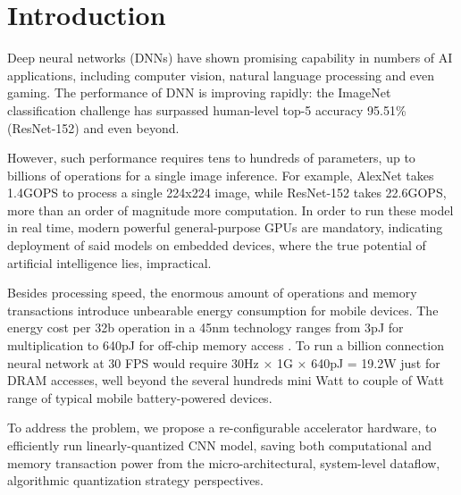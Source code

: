 \chapter{Introduction}
\label{ch:intro}

Deep neural networks (DNNs) have shown promising capability in numbers of AI applications, including computer vision, natural language processing and even gaming. The performance of DNN is improving rapidly: the ImageNet classification challenge has surpassed human-level top-5 accuracy 95.51\% (ResNet-152)\cite{ResNet} and even beyond.

However, such performance requires tens to hundreds of parameters, up to billions of operations for a single image inference. For example, AlexNet \cite{AlexNet} takes 1.4GOPS to process a single 224x224 image, while ResNet-152 takes
22.6GOPS, more than an order of magnitude more computation. In order to run these model in real time, modern powerful general-purpose GPUs are mandatory, indicating deployment of said models on embedded devices, where the true potential of artificial intelligence lies, impractical. 

Besides processing speed, the enormous amount of operations and memory transactions introduce unbearable energy consumption for mobile devices. The energy cost per 32b operation in a 45nm
technology ranges from 3pJ for multiplication to 640pJ for off-chip memory access \cite{EIE}. To run a billion
connection neural network at 30 FPS would require 30Hz × 1G × 640pJ = 19.2W just
for DRAM accesses, well beyond the several hundreds mini Watt to couple of Watt range of typical mobile battery-powered devices.

To address the problem, we propose a re-configurable accelerator hardware, to efficiently run linearly-quantized CNN model, saving both computational and memory transaction power from the micro-architectural, system-level dataflow, algorithmic quantization strategy perspectives.

